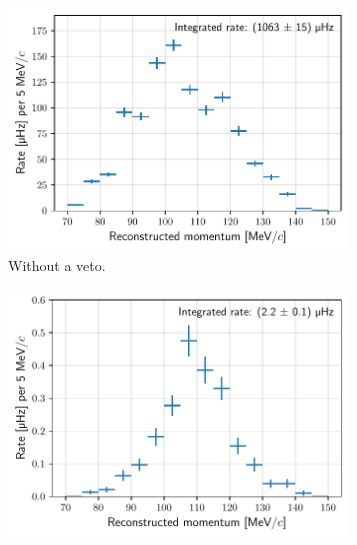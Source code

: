 
\begin{figure}[t]
    \centering
    \begin{subfigure}[t]{0.48\textwidth}
        \centering
        \includegraphics[width=0.99\textwidth]{chapter5/bmc_background_rate_no_crv.pdf}
        \caption{Without a veto.}
        \label{fig:bmc_rate_vs_momentum_no_crv}
    \end{subfigure}
    \hfill
    \begin{subfigure}[t]{0.48\textwidth}
        \centering
        \includegraphics[width=0.99\textwidth]{chapter5/bmc_background_rate_with_crv.pdf}

\end{subfigure}
\end{figure}
